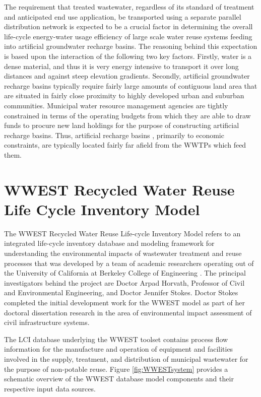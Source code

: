 The requirement that treated wastewater, regardless of its standard of treatment and anticipated end use application, be transported using a separate parallel distribution network is expected to be a crucial factor in determining the overall life-cycle energy-water usage efficiency of large scale water reuse systems feeding into artificial groundwater recharge basins. The reasoning behind this expectation is based upon the interaction of the following two key factors. Firstly,  water is a dense material, and thus it is very energy intensive to transport it over long distances and against steep elevation gradients. Secondly, artificial groundwater recharge basins typically require fairly large amounts of contiguous land area that are situated in fairly close proximity to highly developed urban and suburban communities. Municipal water resource management agencies are tightly constrained in terms of the operating budgets from which they are able to draw funds to procure new land holdings for the purpose of constructing artificial recharge basins. Thus, artificial recharge basins , primarily to economic constraints, are typically located fairly far afield from the WWTPs which feed them.
 
\section{WWEST Recycled Water Reuse Life Cycle Inventory Model}

The WWEST Recycled Water Reuse Life-cycle Inventory Model refers to an integrated life-cycle inventory database and modeling framework for understanding the environmental impacts of wastewater treatment and reuse processes that was developed by a team of academic researchers operating out of the University of California at Berkeley College of Engineering \cite{Stokes2010}. The principal investigators behind the project are Doctor Arpad Horvath, Professor of Civil and Environmental Engineering, and Doctor Jennifer Stokes. Doctor Stokes completed the initial development work for the WWEST model as part of her doctoral dissertation research in the area of environmental impact assessment of civil infrastructure systems.

The LCI database underlying the WWEST toolset contains process flow information for the manufacture and operation of equipment and facilities involved in the supply, treatment, and distribution of municipal wastewater for the purpose of non-potable reuse. Figure \ref{fig:WWESTsystem} 
provides a schematic overview of the WWEST database model components and their respective input data sources.

